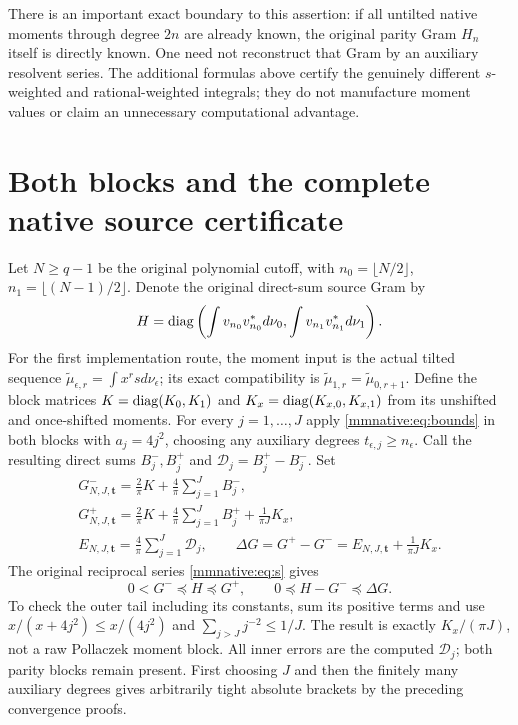 There is an important exact boundary to this assertion: if all
untilted native moments through degree $2n$ are already known, the
original parity Gram $H_n$ itself is directly known.  One need not
reconstruct that Gram by an auxiliary resolvent series.  The additional
formulas above certify the genuinely different $s$-weighted and
rational-weighted integrals; they do not manufacture moment values or
claim an unnecessary computational advantage.

\section{Both blocks and the complete native source certificate}

Let $N\ge q-1$ be the original polynomial cutoff, with
$n_0=\lfloor N/2\rfloor$, $n_1=\lfloor(N-1)/2\rfloor$.  Denote
the original direct-sum source Gram by
\[
 H=\operatorname{diag}\left(\int v_{n_0}v_{n_0}^*d\nu_0,
                  \int v_{n_1}v_{n_1}^*d\nu_1\right).
\]
For the first implementation route, the moment input is the actual
tilted sequence $\widetilde\mu_{\epsilon,r}=\int x^rsd\nu_\epsilon$;
its exact compatibility is
$\widetilde\mu_{1,r}=\widetilde\mu_{0,r+1}$.  Define the block
matrices $K=\operatorname{diag}(K_0,K_1)$ and
$K_x=\operatorname{diag}(K_{x,0},K_{x,1})$ from its unshifted and once-shifted
moments.  For every $j=1,\ldots,J$ apply \eqref{mmnative:eq:bounds} in
both blocks with $a_j=4j^2$, choosing any auxiliary degrees
$t_{\epsilon,j}\ge n_\epsilon$.  Call the resulting direct sums
$B_j^-,B_j^+$ and $\mathcal D_j=B_j^+-B_j^-$.  Set
\begin{equation}\label{mmnative:eq:Gpm}
 \begin{gathered}
 G^-_{N,J,\mathbf t}=\frac2\pi K+\frac4\pi\sum_{j=1}^JB_j^-,\\
 G^+_{N,J,\mathbf t}=\frac2\pi K+\frac4\pi\sum_{j=1}^JB_j^+
                       +\frac1{\pi J}K_x,\\
 E_{N,J,\mathbf t}=\frac4\pi\sum_{j=1}^J\mathcal D_j,
 \qquad\Delta G=G^+-G^-=E_{N,J,\mathbf t}+\frac1{\pi J}K_x.
 \end{gathered}
\end{equation}
The original reciprocal series \eqref{mmnative:eq:s} gives
\begin{equation}\label{mmnative:eq:sourcebounds}
 \boxed{0<G^-\preceq H\preceq G^+,\qquad
 0\preceq H-G^-\preceq\Delta G.}
\end{equation}
To check the outer tail including its constants, sum its positive
terms and use $x/(x+4j^2)\le x/(4j^2)$ and
$\sum_{j>J}j^{-2}\le1/J$.  The result is exactly
$K_x/(\pi J)$, not a raw Pollaczek moment block.  All inner errors
are the computed $\mathcal D_j$; both parity blocks remain present.
First choosing $J$ and then the finitely many auxiliary degrees gives
arbitrarily tight absolute brackets by the preceding convergence proofs.

